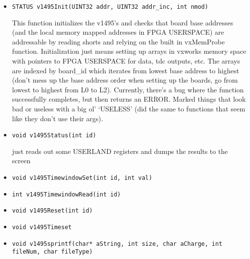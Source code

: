 \documentclass[11pt]{article}
\begin{document}
		\begin{itemize}	
		\item
			\begin{lstlisting}
STATUS v1495Init(UINT32 addr, UINT32 addr_inc, int nmod)
			\end{lstlisting}
			This function initializes the v1495's and checks that board base addresses (and the local memory mapped addresses in FPGA USERSPACE) are addressable by reading shorts and relying on the built in vxMemProbe function. Initialization just means setting up arrays in vxworks memory space with pointers to FPGA USERSPACE for data, tdc outputs, etc. The arrays are indexed by board\_id which iterates from lowest base address to highest (don't mess up the base address order when setting up the boards, go from lowest to highest from L0 to L2). Currently, there's a bug where the function successfully completes, but then returns an ERROR. Marked things that look bad or useless with a big ol' `USELESS' (did the same to functions that seem like they don't use their args).
			
		\item
			\begin{lstlisting}
void v1495Status(int id)
			\end{lstlisting}
			just reads out some USERLAND registers and dumps the results to the screen
			
		\item 
			\begin{lstlisting}
void v1495TimewindowSet(int id, int val)
			\end{lstlisting}
			
		\item
			\begin{lstlisting}
int v1495TimewindowRead(int id)			
			\end{lstlisting}
			
		\item
			\begin{lstlisting}
void v1495Reset(int id)			
			\end{lstlisting}
			
		\item
			\begin{lstlisting}
void v1495Timeset			
			\end{lstlisting}
			
		\item
			\begin{lstlisting}
void v1495sprintf(char* aString, int size, char aCharge, int fileNum, char fileType)			
			\end{lstlisting}
			

\end{itemize}
\end{document}
